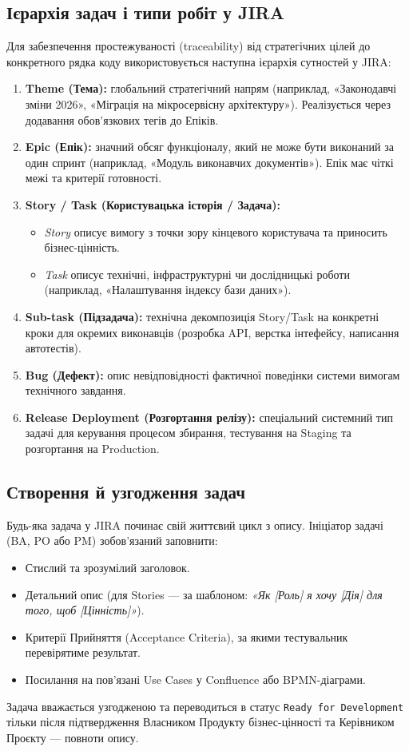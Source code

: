 \documentclass{article}
\begin{document}
\subsection{Ієрархія задач і типи робіт у JIRA}
Для забезпечення простежуваності (traceability) від стратегічних цілей до конкретного рядка коду використовується наступна ієрархія сутностей у JIRA:
\begin{enumerate}
    \item \textbf{Theme (Тема):} глобальний стратегічний напрям (наприклад, «Законодавчі зміни 2026», «Міграція на мікросервісну архітектуру»). Реалізується через додавання обов'язкових тегів до Епіків.
    \item \textbf{Epic (Епік):} значний обсяг функціоналу, який не може бути виконаний за один спринт (наприклад, «Модуль виконавчих документів»). Епік має чіткі межі та критерії готовності.
    \item \textbf{Story / Task (Користувацька історія / Задача):} 
    \begin{itemize}
        \item \emph{Story} описує вимогу з точки зору кінцевого користувача та приносить бізнес-цінність.
        \item \emph{Task} описує технічні, інфраструктурні чи дослідницькі роботи (наприклад, «Налаштування індексу бази даних»).
    \end{itemize}
    \item \textbf{Sub-task (Підзадача):} технічна декомпозиція Story/Task на конкретні кроки для окремих виконавців (розробка API, верстка інтефейсу, написання автотестів).
    \item \textbf{Bug (Дефект):} опис невідповідності фактичної поведінки системи вимогам технічного завдання.
    \item \textbf{Release Deployment (Розгортання релізу):} спеціальний системний тип задачі для керування процесом збирання, тестування на Staging та розгортання на Production.
\end{enumerate}

\subsection{Створення й узгодження задач}
Будь-яка задача у JIRA починає свій життєвий цикл з опису. Ініціатор задачі (BA, PO або PM) зобов'язаний заповнити:
\begin{itemize}
    \item Стислий та зрозумілий заголовок.
    \item Детальний опис (для Stories --- за шаблоном: \emph{«Як [Роль] я хочу [Дія] для того, щоб [Цінність]»}).
    \item Критерії Прийняття (Acceptance Criteria), за якими тестувальник перевірятиме результат.
    \item Посилання на пов'язані Use Cases у Confluence або BPMN-діаграми.
\end{itemize}
Задача вважається узгодженою та переводиться в статус \texttt{Ready for Development} тільки після підтвердження Власником Продукту бізнес-цінності та Керівником Проєкту --- повноти опису.
\end{document}
